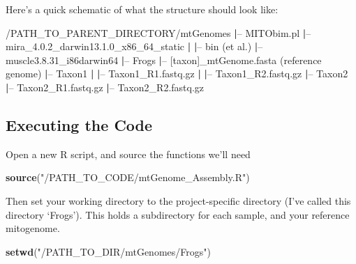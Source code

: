 \documentclass[]{article}
\newenvironment{Shaded}{\begin{snugshade}}{\end{snugshade}}
\newcommand{\ExtensionTok}[1]{#1}
\newcommand{\KeywordTok}[1]{\textcolor[rgb]{0.13,0.29,0.53}{\textbf{#1}}}
\newcommand{\NormalTok}[1]{#1}
\newcommand{\StringTok}[1]{\textcolor[rgb]{0.31,0.60,0.02}{#1}}
\begin{document}
Here's a quick schematic of what the structure should look like:

\begin{Shaded}
\begin{Highlighting}[]
\ExtensionTok{/PATH_TO_PARENT_DIRECTORY/mtGenomes}
\KeywordTok{|}\ExtensionTok{--}\NormalTok{ MITObim.pl}
\KeywordTok{|}\ExtensionTok{--}\NormalTok{ mira_4.0.2_darwin13.1.0_x86_64_static}
\KeywordTok{|}   \KeywordTok{|}\ExtensionTok{--}\NormalTok{ bin (et al.)}
\KeywordTok{|}\ExtensionTok{--}\NormalTok{ muscle3.8.31_i86darwin64}
\KeywordTok{|}\ExtensionTok{--}\NormalTok{ Frogs}
    \KeywordTok{|}\ExtensionTok{--}\NormalTok{ [taxon]_mtGenome.fasta (reference genome)}
    \KeywordTok{|}\ExtensionTok{--}\NormalTok{ Taxon1}
    \KeywordTok{|}   \KeywordTok{|}\ExtensionTok{--}\NormalTok{ Taxon1_R1.fastq.gz}
    \KeywordTok{|}   \KeywordTok{|}\ExtensionTok{--}\NormalTok{ Taxon1_R2.fastq.gz}
    \KeywordTok{|}\ExtensionTok{--}\NormalTok{ Taxon2}
        \KeywordTok{|}\ExtensionTok{--}\NormalTok{ Taxon2_R1.fastq.gz}
        \KeywordTok{|}\ExtensionTok{--}\NormalTok{ Taxon2_R2.fastq.gz}
\end{Highlighting}
\end{Shaded}

\pagebreak

\hypertarget{executing-the-code}{%
\subsection{Executing the Code}\label{executing-the-code}}

Open a new R script, and source the functions we'll need

\begin{Shaded}
\begin{Highlighting}[]
\KeywordTok{source}\NormalTok{(}\StringTok{"/PATH_TO_CODE/mtGenome_Assembly.R"}\NormalTok{)}
\end{Highlighting}
\end{Shaded}

Then set your working directory to the project-specific directory (I've
called this directory `Frogs'). This holds a subdirectory for each
sample, and your reference mitogenome.

\begin{Shaded}
\begin{Highlighting}[]
\KeywordTok{setwd}\NormalTok{(}\StringTok{"/PATH_TO_DIR/mtGenomes/Frogs"}\NormalTok{)}
\end{Highlighting}
\end{Shaded}
\end{document}
